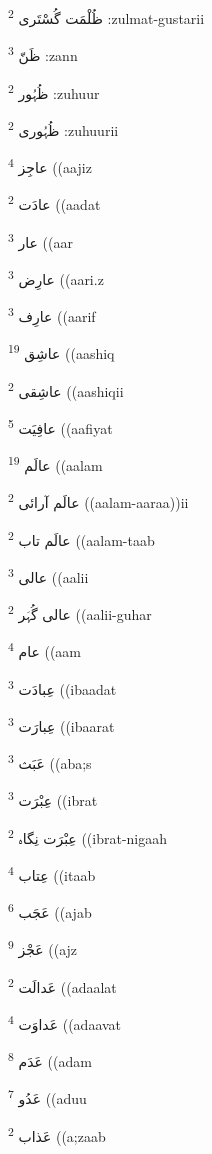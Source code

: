 \documentclass[12pt]{article}
\begin{document}
\begin{RTL}
\begin{multicols}{5}
{\ur ظُلْمَت گُسْتَری}   \textsuperscript{2} :zulmat-gustarii

{\ur ظَنّ}   \textsuperscript{3} :zann

{\ur ظُہُور}   \textsuperscript{2} :zuhuur

{\ur ظُہُوری}   \textsuperscript{2} :zuhuurii

{\ur عاجِز}   \textsuperscript{4} ((aajiz

{\ur عادَت}   \textsuperscript{2} ((aadat

{\ur عار}   \textsuperscript{3} ((aar

{\ur عارِض}   \textsuperscript{3} ((aari.z

{\ur عارِف}   \textsuperscript{3} ((aarif

{\ur عاشِق}   \textsuperscript{19} ((aashiq

{\ur عاشِقی}   \textsuperscript{2} ((aashiqii

{\ur عافِیَت}   \textsuperscript{5} ((aafiyat

{\ur عالَم}   \textsuperscript{19} ((aalam

{\ur عالَم آرائی}   \textsuperscript{2} ((aalam-aaraa))ii

{\ur عالَم تاب}   \textsuperscript{2} ((aalam-taab

{\ur عالی}   \textsuperscript{3} ((aalii

{\ur عالی گُہَر}   \textsuperscript{2} ((aalii-guhar

{\ur عام}   \textsuperscript{4} ((aam

{\ur عِبادَت}   \textsuperscript{3} ((ibaadat

{\ur عِبارَت}   \textsuperscript{3} ((ibaarat

{\ur عَبَث}   \textsuperscript{3} ((aba;s

{\ur عِبْرَت}   \textsuperscript{3} ((ibrat

{\ur عِبْرَت نِگاہ}   \textsuperscript{2} ((ibrat-nigaah

{\ur عِتاب}   \textsuperscript{4} ((itaab

{\ur عَجَب}   \textsuperscript{6} ((ajab

{\ur عَجْز}   \textsuperscript{9} ((ajz

{\ur عَدالَت}   \textsuperscript{2} ((adaalat

{\ur عَداوَت}   \textsuperscript{4} ((adaavat

{\ur عَدَم}   \textsuperscript{8} ((adam

{\ur عَدُو}   \textsuperscript{7} ((aduu

{\ur عَذاب}   \textsuperscript{2} ((a;zaab


\end{multicols}
\end{RTL}
\end{document}
